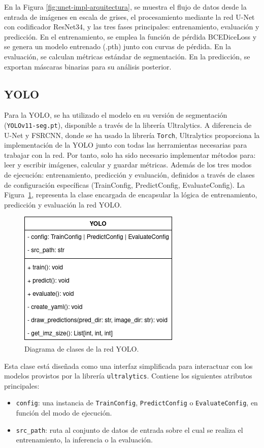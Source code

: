 \documentclass[../main.tex]{subfiles}
\begin{document}
En la Figura \ref{fig:unet-impl-arquitectura}, se muestra el flujo de datos desde la entrada de imágenes en escala de grises, el procesamiento mediante la red U-Net con codificador ResNet34, y las tres fases principales: entrenamiento, evaluación y predicción. En el entrenamiento, se emplea la función de pérdida BCEDiceLoss y se genera un modelo entrenado (.pth) junto con curvas de pérdida. En la evaluación, se calculan métricas estándar de segmentación. En la predicción, se exportan máscaras binarias para su análisis posterior.

\subsection{YOLO}
Para la YOLO, se ha utilizado el modelo en su versión de segmentación (\texttt{YOLOv11-seg.pt}), disponible a través de la librería Ultralytics. A diferencia de U-Net y FSRCNN, donde se ha usado la librería \texttt{Torch}, Ultralytics proporciona la implementación de la YOLO junto con todas las herramientas necesarias para trabajar con la red. Por tanto, solo ha sido necesario implementar métodos para: leer y escribir imágenes, calcular y guardar métricas. Además de los tres modos de ejecución: entrenamiento, predicción y evaluación, definidos a través de clases de configuración específicas (TrainConfig, PredictConfig, EvaluateConfig). La Figura~\ref{fig:yolo-class-diag}, representa la clase encargada de encapsular la lógica de entrenamiento, predicción y evaluación la red YOLO.

\begin{figure}
    \centering
    \includegraphics[width=0.5\linewidth]{imgs/impl/yolo-class-diag.drawio.png}
    \caption{Diagrama de clases de la red YOLO.}
    \label{fig:yolo-class-diag}
\end{figure}

Esta clase está diseñada como una interfaz simplificada para interactuar con los modelos provistos por la librería \texttt{ultralytics}. Contiene los siguientes atributos principales:
\begin{itemize}
    \item \texttt{config}: una instancia de \texttt{TrainConfig}, \texttt{PredictConfig} o \texttt{EvaluateConfig}, en función del modo de ejecución.

    \item \texttt{src\_path}: ruta al conjunto de datos de entrada sobre el cual se realiza el entrenamiento, la inferencia o la evaluación. 
\end{itemize}
    
\end{document}
